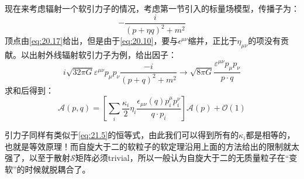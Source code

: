 现在来考虑辐射一个软引力子的情况，考虑第一节引入的标量场模型，传播子为：
\begin{equation}
	-\frac{i }{(p+\eta q)^2+m^2}
\end{equation}
顶点由\ref{eq:20.17}给出，但是由于\ref{eq:20.10}，要与$\epsilon^{\mu\nu}$缩并，正比于$\eta_{\mu\nu}$的项没有贡献。以出射外线辐射软引力子为例，给出因子：
\begin{equation}
	i\sqrt{32\pi G}\varepsilon^{\mu\nu}p_{\mu}p_{\nu}\frac{-i}{\left(p+q\right)^{2}+m^{2}}\rightarrow\sqrt{8\pi G}\frac{\varepsilon^{\mu\nu}p_{\mu}p_{\nu}}{p\cdot q}
\end{equation}
求和后得到：
\begin{equation}
	\boxed{
	\mathcal{A}(p,q)=\left[\sum_i\frac{\kappa_i}{2}\eta_i\frac{\epsilon_{\mu\nu}(q)p_i^\mu p_i^\nu}{q\cdot p_i}\right]\mathcal{A}(p)+\mathcal{O}(1)}
\end{equation}

引力子同样有类似于\ref{eq:21.5}的恒等式，由此我们可以得到所有的$\kappa_i$都是相等的，也就是等效原理！而自旋大于二的软粒子的软定理沿用上面的方法给出的限制就太强了，以至于散射$\mathcal{S}$矩阵必须trivial，所以一般认为自旋大于二的无质量粒子在“变软”的时候就脱耦合了。
